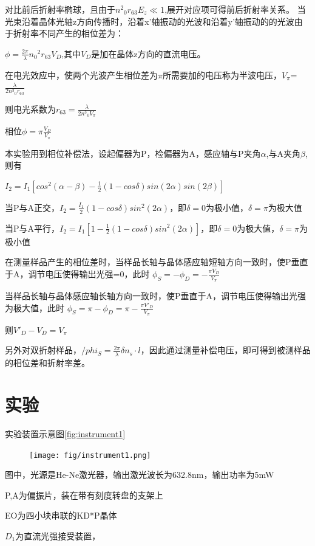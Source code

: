 \documentclass[font=default]{mpltx}
\begin{document}
对比前后折射率椭球，且由于${n^2}_0$$r_{63}E_z \ll 1$,展开对应项可得前后折射率关系。
当光束沿着晶体光轴z方向传播时，沿着x'轴振动的光波和沿着y'轴振动的的光波由于折射率不同产生的相位差为：

$\phi = \frac{2\pi}{\lambda}{n_0}^{2}r_{63}V_D$,其中$V_D$是加在晶体z方向的直流电压。

在电光效应中，使两个光波产生相位差为$\pi$所需要加的电压称为半波电压，$V_\pi$=$\frac{\lambda}{2{n^3}_0r_{63}}$

则电光系数为$r_{63} = \frac{\lambda}{2{n^3}_0V_\pi}$

相位$\phi = \pi \frac{V_D}{V_\pi}$


本实验用到相位补偿法，设起偏器为P，检偏器为A，感应轴与P夹角$\alpha$,与A夹角$\beta$,则有

$I_2 = I_1[cos^2 (\alpha - \beta) - \frac{1}{2} (1 - cos\delta)sin(2\alpha)sin(2\beta)]$

当P与A正交，$I_2 = \frac{I_1}{2} (1 - cos\delta)sin^2(2\alpha)$，即$\delta = 0$为极小值，$\delta = \pi$为极大值

当P与A平行，$I_2 = I_1[1 - \frac{1}{2} (1 - cos\delta)sin^2(2\alpha)]$，即$\delta = 0$为极大值，$\delta = \pi$为极小值

在测量样品产生的相位差时，当样品长轴与晶体感应轴短轴方向一致时，使P垂直于A，调节电压使得输出光强=0，此时
$\phi_S = - \phi_D = - \frac{\pi V_D}{V_\pi}$

当样品长轴与晶体感应轴长轴方向一致时，使P垂直于A，调节电压使得输出光强为极大值，此时
$\phi_S = \pi - \phi_D = \pi - \frac{\pi {V'}_D}{V_\pi}$

则${V'}_D - V_D = V_\pi$

另外对双折射样品，$/phi_S = \frac{2\pi}{\lambda} \delta n_s \cdot l$，因此通过测量补偿电压，即可得到被测样品的相位差和折射率差。

\section{实验}
实验装置示意图\autoref{fig:instrument1}

\begin{figure}
  \centering
  \texttt{[image: fig/instrument1.png]}
  \label{fig:instrument1}
\end{figure}

图中，光源是He-Ne激光器，输出激光波长为632.8nm，输出功率为5mW

P,A为偏振片，装在带有刻度转盘的支架上

EO为四小块串联的KD*P晶体 

$D_1$为直流光强接受装置，
\end{document}
